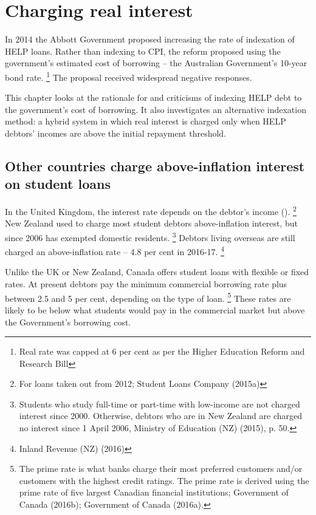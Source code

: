 \documentclass[embargoed]{grattan}
\begin{document}
{\chapter{Charging real interest}\label{chap:5-charging-real-interest}

In 2014 the Abbott Government proposed increasing the rate of indexation of \gls{HELP} loans.
Rather than indexing to \gls{CPI}, the reform proposed using the government's estimated cost of borrowing -- the Australian Government's 10-year bond rate.%
\footnote{Real rate was capped at 6 per cent as per the Higher Education Reform and Research Bill} The proposal received widespread negative responses.

This chapter looks at the rationale for and criticisms of indexing \gls{HELP} debt to the government's cost of borrowing.
It also investigates an alternative indexation method: a hybrid system in which real interest is charged only when \gls{HELP} debtors' incomes are above the initial repayment threshold.

\section{Other countries charge above-inflation interest on student loans}\label{other-countries-charge-above-inflation-interest-on-student-loans}

In the United Kingdom, the interest rate depends on the debtor's income ().%
\footnote{For loans taken out from 2012; Student Loans Company (2015a)} New Zealand used to charge most student debtors above-inflation interest, but since 2006 has exempted domestic residents.%
\footnote{Students who study full-time or part-time with low-income are not charged interest since 2000.
Otherwise, debtors who are in New Zealand are charged no interest since 1 April 2006, Ministry of Education (NZ) (2015), p. 50.} Debtors living overseas are still charged an above-inflation rate -- 4.8 per cent in 2016-17.%
\footnote{Inland Revenue (NZ) (2016)}

Unlike the UK or New Zealand, Canada offers student loans with flexible or fixed rates.
At present debtors pay the minimum commercial borrowing rate plus between 2.5 and 5 per cent, depending on the type of loan.%
\footnote{The prime rate is what banks charge their most preferred customers and/or customers with the highest credit ratings.
The prime rate is derived using the prime rate of five largest Canadian financial institutions; Government of Canada (2016b); Government of Canada (2016a).} These rates are likely to be below what students would pay in the commercial market but above the Government's borrowing cost.

}
\end{document}
